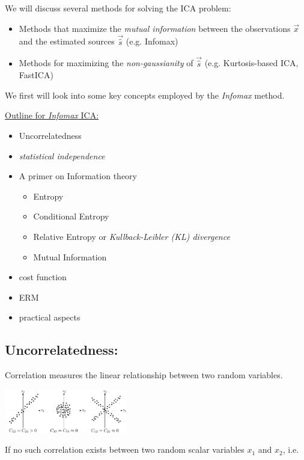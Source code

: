 We will discuss several methods for solving the ICA problem:

\begin{itemize}
\item Methods that maximize the \emph{mutual information} between the observations $\vec x$ and the estimated sources $\vec {\hat s}$ (e.g. Infomax)
\item Methods for maximizing the \emph{non-gaussianity} of $\vec {\hat s}$ (e.g. Kurtosis-based ICA, FastICA)
\end{itemize}

We first will look into some key concepts employed by the \emph{Infomax} method.

\newpage

\underline{Outline for \emph{Infomax} ICA:}
\begin{itemize}
    \item Uncorrelatedness
    \item \emph{statistical independence}
    \item A primer on Information theory
    \begin{itemize}
        \item Entropy
        \item Conditional Entropy
        \item Relative Entropy or \emph{Kullback-Leibler (KL) divergence}
        \item Mutual Information
    \end{itemize}
    \item cost function
    \item ERM
    \item practical aspects
\end{itemize}

\subsection{Uncorrelatedness:}

Correlation measures the linear relationship between two random variables.
\begin{center}
\includegraphics[width=0.4\textwidth]{img/section2_fig3.pdf}
\end{center}

If no such correlation exists between two random scalar variables $x_1$ and $x_2$, i.e.

